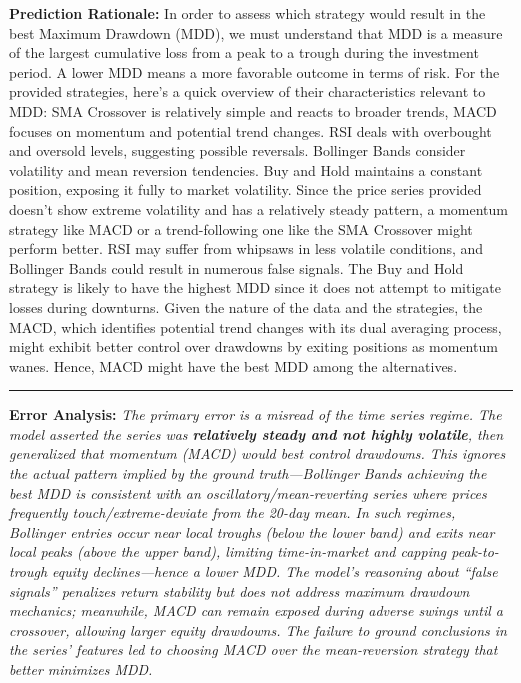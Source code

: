\begin{ReasoningBox}[title=Perception Error]
    \textbf{Prediction Rationale:} In order to assess which strategy would result in the best Maximum Drawdown (MDD), we must understand that MDD is a measure of the largest cumulative loss from a peak to a trough during the investment period. A lower MDD means a more favorable outcome in terms of risk. For the provided strategies, here's a quick overview of their characteristics relevant to MDD: SMA Crossover is relatively simple and reacts to broader trends, MACD focuses on momentum and potential trend changes. RSI deals with overbought and oversold levels, suggesting possible reversals. Bollinger Bands consider volatility and mean reversion tendencies. Buy and Hold maintains a constant position, exposing it fully to market volatility. Since the price series provided doesn't show extreme volatility and has a relatively steady pattern, a momentum strategy like MACD or a trend-following one like the SMA Crossover might perform better. RSI may suffer from whipsaws in less volatile conditions, and Bollinger Bands could result in numerous false signals. The Buy and Hold strategy is likely to have the highest MDD since it does not attempt to mitigate losses during downturns. Given the nature of the data and the strategies, the MACD, which identifies potential trend changes with its dual averaging process, might exhibit better control over drawdowns by exiting positions as momentum wanes. Hence, MACD might have the best MDD among the alternatives. \\
    \par            %
    \hrule          %
    \vspace{0.8em}  %
    \textbf{Error Analysis:} \textit{The primary error is a misread of the time series regime. The model asserted the series was \textbf{relatively steady and not highly volatile}, then generalized that momentum (MACD) would best control drawdowns. This ignores the actual pattern implied by the ground truth—Bollinger Bands achieving the best MDD is consistent with an oscillatory/mean‑reverting series where prices frequently touch/extreme-deviate from the 20-day mean. In such regimes, Bollinger entries occur near local troughs (below the lower band) and exits near local peaks (above the upper band), limiting time-in-market and capping peak-to-trough equity declines—hence a lower MDD. The model’s reasoning about “false signals” penalizes return stability but does not address maximum drawdown mechanics; meanwhile, MACD can remain exposed during adverse swings until a crossover, allowing larger equity drawdowns. The failure to ground conclusions in the series’ features led to choosing MACD over the mean-reversion strategy that better minimizes MDD.}
\end{ReasoningBox}